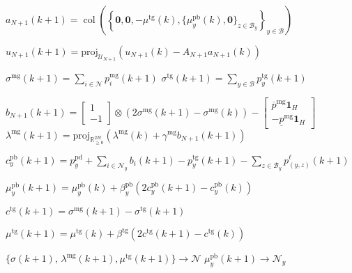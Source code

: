 \documentclass[10pt]{article}
\newtheorem{definitiox	n}{Definition}{\it}{}
\newcommand{\mc}{\mathcal}
\newcommand{\bb}{\mathbb}
\newcommand{\R}{\bb R}
\newcommand{\red}{\textcolor{red}}
\newcommand{\proj}{\mathrm{proj}}
\newcommand{\col}{\operatorname{col}}
\newcommand{\0}{\mathbf{0}}
\newcommand{\1}{\mathbf{1}}
\begin{document}
\begin{algorithm}[H]
\begin{algorithmic}[1]
\EndDual

\EndFor

\DSO{ }

\Primal{}
\State
$a_{N+1}(k+1) = \col \left( 
	\left\{
	\0,\0,-\mu^{\text{tg}}(k), 
	\{ \mu_y^{\text{pb}}(k), \0 \}_{z \in \mc B_y}
	\right\}_{y \in \mc B}
	\right)$

\State 	$u_{N+1}(k+1) = \proj_{\mc U_{N+1}}  \left( u_{N+1}(k) - A_{N+1} a_{N+1}(k) \right)$
\Comment{\red{solved via Algorithm 2}}
\EndPrimal

\Agg{}
\State
$ \sigma^{\text{mg}}(k+1) = \sum_{i \in \mc N} p_i^{\text{mg}}(k+1) $
\State
$\sigma^{\text{tg}}(k+1) = \sum_{y \in \mc B} p_y^{\text{tg}}(k+1)$
\EndAgg

\Dual{}
\State
$b_{N+1}(k+1	) = 
	\left[
	\begin{smallmatrix}
	1\\
	- 1 
	\end{smallmatrix}
	\right] \otimes (2 \sigma^{\text{mg}}(k+1)- \sigma^{\text{mg}}(k)) 
	-
	\left[
	\begin{smallmatrix}
	\overline{p}^{\mathrm{mg}}\1_{H} \\
	-     \underline{p}^{\mathrm{mg}} \1_{H}
	\end{smallmatrix} 
	\right]  $
	\State
$\lambda^{\text{mg}}(k+1) = \textstyle
	\proj_{\R^{2 H}_{\geq 0}}\left( 
	\lambda^{\text{mg}}(k) + \gamma^{\text{mg}} b_{N+1}(k+1)
	 \right)$

\ForAll{buses $ y \in \mc B$}

\State
$c^{\text{pb}}_y(k+1)   = p_y^{\text{pd}} + \sum_{i \in \mc N_y} b_i(k+1)- p^{\text{tg}}_y(k+1) - \sum_{z \in \mc B_y} p^\ell_{(y,z)} (k+1)$

\State
$\mu_y^{\text{pb}}(k+1) = \mu_y^{\text{pb}}(k) + \beta^{\text{pb}}_y (2 c^{\text{pb}}_y(k+1)- c^{\text{pb}}_y(k))$
\EndFor

\State
$c^{\text{tg}}(k+1) = \sigma^{\text{mg}}
	(k+1)- \sigma^{\text{tg}}(k+1)$

\State
$\mu^{\text{tg}}(k+1) = \mu^{\text{tg}}(k) + \beta^{\text{tg}} (2c^{\text{tg}}(k+1)-c^{\text{tg}}(k))$
\EndDual	

\Comm{ }
\State
$ \{ \sigma(k+1), \, \lambda^{\text{mg}}(k+1), \mu^{\text{tg}}(k+1) \} 
	\longrightarrow  \mc N$
\ForAll{buses $ y \in \mc B$}
\State
$\mu^{\text{pb}}_y(k+1)\longrightarrow \mc N_y$
\EndFor

\EndComm

\EndDSO	

\EndIUC	

\end{algorithmic}
\end{algorithm}
\end{document}
